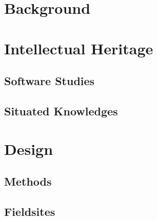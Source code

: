 \documentclass[a4paper,man,natbib]{apa6}
\begin{document}
   \section*{Background}
   \section*{Intellectual Heritage}
   \subsection*{Software Studies}
   \subsection*{Situated Knowledges}
   \section*{Design}
   \subsection*{Methods}
   \subsection*{Fieldsites}
\end{document}
